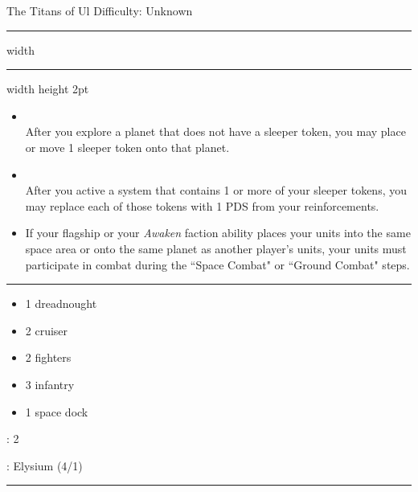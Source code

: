 {\handel\Huge The Titans of Ul} \hfill {\Large Difficulty: Unknown} \vspace{-4pt}\\
\hrule width \hsize \kern 1mm \hrule width \hsize height 2pt


\begin{multicols}{2}


\begin{itemize}
\item {}\\
After you explore a planet that does not have a sleeper token, you may place or move 1 sleeper token onto that planet.
\item {}\\
After you active a system that contains 1 or more of your sleeper tokens, you may replace each of those tokens with 1 PDS from your reinforcements.
\item {} If your flagship or your \emph{Awaken} faction ability places your units into the same space area or onto the same planet as another player’s units, your units must participate in combat during the ``Space Combat" or ``Ground Combat" steps. 
\end{itemize}


\vspace{-10pt}\rule{\hsize}{0.4pt}\vspace{5pt}


\vspace{-5pt}
\begin{multicols}{2}
\begin{itemize}
\item 1 dreadnought
\item 2 cruiser
\item 2 fighters
\item 3 infantry
\item 1 space dock
\end{itemize}
\end{multicols}

\vspace{-5pt}
: 2

\vspace{2pt}
: Elysium (4/1)

\rule{\hsize}{0.4pt}\vspace{5pt}



\end{multicols}
